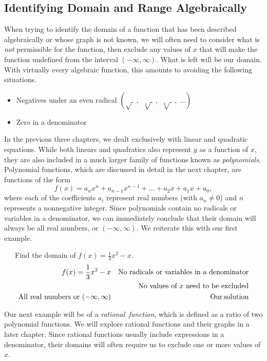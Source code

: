 \subsection{Identifying Domain and Range Algebraically}


When trying to identify the domain of a function that has been described algebraically or whose graph is not known, we will often need to consider what is \textit{not} permissible for the function, then exclude any values of $x$ that will make the function undefined from the interval $(-\infty,\infty)$.  What is left will be our domain.  With virtually every algebraic function, this amounts to avoiding the following situations.
\begin{itemize}
	\item Negatives under an even radical $\left(\sqrt{~}~,~~\sqrt[4]{~}~,~~\sqrt[6]{~}~,~\ldots\right)$
	\item Zero in a denominator
\end{itemize}
In the previous three chapters, we dealt exclusively with linear and quadratic equations.  While both linears and quadratics also represent $y$ as a function of $x$, they are also included in a much larger family of functions known as \textit{polynomials}.  Polynomial functions, which are discussed in detail in the next chapter, are functions of the form
$$f(x)=a_nx^n+a_{n-1}x^{n-1}+\ldots+a_2x+a_1x+a_0,$$
where each of the coefficients $a_i$ represent real numbers (with $a_n\neq 0$) and $n$ represents a nonnegative integer.  Since polynomials  contain no radicals or variables in a denominator, we can immediately conclude that their domain will always be all real numbers, or $(-\infty,\infty)$.  We reiterate this with our first example.
  
\begin{example}~~~Find the domain of $f(x)=\frac{1}{3} x^2-x$.
  \begin{eqnarray*}
    f (x) = \frac{1}{3} x^2 - x & & \text{No~radicals~or~variables~in~a~denominator}\\
		& & \text{No~values~of~} x\text{~need~to~be~excluded}\\
		\operatorname{All~real~numbers~or~}(-\infty,\infty) & & \operatorname{Our} \operatorname{solution}
 \end{eqnarray*}
 \end{example}

Our next example will be of a \textit{rational~function}, which is defined as a ratio of two polynomial functions.  We will explore rational functions and their graphs in a later chapter.  Since rational functions usually include expressions in a denominator, their domains will often require us to exclude one or more values of $x$.

